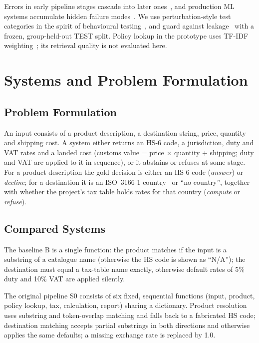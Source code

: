 \documentclass[conference]{IEEEtran}
\begin{document}
Errors in early pipeline stages cascade into later
ones~\cite{finkel2006}, and production ML systems accumulate hidden failure modes~\cite{sculley2015, breck2017}. We use
perturbation-style test categories in the spirit of behavioural testing~\cite{ribeiro2020}, and guard against
leakage~\cite{kapoor2023} with a frozen, group-held-out TEST split. Policy lookup in the prototype uses TF-IDF
weighting~\cite{salton1988}; its retrieval quality is not evaluated here.

\section{Systems and Problem Formulation}
\subsection{Problem Formulation}
An input consists of a product description, a destination string, price, quantity and shipping cost. A
system either returns an HS-6 code, a jurisdiction, duty and VAT rates and a landed cost (customs value = price
$\times$ quantity + shipping; duty and VAT are applied to it in sequence), or it abstains or refuses at some stage. For a
product description the gold decision is either an HS-6 code (\emph{answer}) or \emph{decline}; for a destination it is
an ISO~3166-1 country~\cite{iso3166} or ``no country'', together with whether the project's tax table holds rates for that
country (\emph{compute} or \emph{refuse}).

\subsection{Compared Systems}
The baseline B is a single function: the product matches if the input is a substring of a catalogue name (otherwise
the HS code is shown as ``N/A''); the destination must equal a tax-table name exactly, otherwise default rates of 5\% duty
and 10\% VAT are applied silently.

The original pipeline S0 consists of six fixed, sequential functions (input, product, policy lookup, tax,
calculation, report) sharing a dictionary. Product resolution uses substring and token-overlap matching and falls back
to a fabricated HS code; destination matching accepts partial substrings in both directions and otherwise applies the
same defaults; a missing exchange rate is replaced by 1.0.
\end{document}
